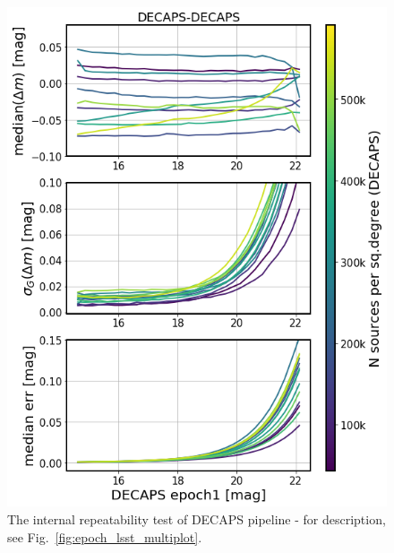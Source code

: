 \documentclass[DM,lsstdraft,toc,usenatbib]{lsstdoc}
\begin{document}
\begin{figure}
\begin{centering}
\includegraphics[width=0.8\columnwidth]{figs/decaps-decaps_rms_plot.png}
\caption{The internal repeatability test of DECAPS pipeline - for description, see Fig.~\ref{fig:epoch_lsst_multiplot}.}
\label{fig:epoch_decaps_multiplot}
\end{centering}
\end{figure} 
\end{document}
